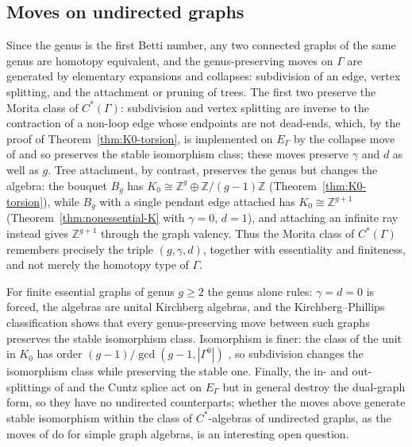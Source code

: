 \documentclass[12pt,reqno]{amsart}
\theoremstyle{plain}
\theoremstyle{definition}
\newcommand{\Z}{\mathbb{Z}}
\begin{document}
\subsection*{Moves on undirected graphs}
Since the genus is the first Betti number, any two connected graphs of the same genus are homotopy
equivalent, and the genus-preserving moves on $\Gamma$ are generated by elementary expansions and
collapses: subdivision of an edge, vertex splitting, and the attachment or pruning of trees. The
first two preserve the Morita class of $C^*(\Gamma)$: subdivision and vertex splitting are inverse
to the contraction of a non-loop edge whose endpoints are not dead-ends, which, by the proof of
Theorem~\ref{thm:K0-torsion}, is implemented on $E_\Gamma$ by the collapse move of
\cite[Theorem~5.2]{Sorensen} and so preserves the stable isomorphism class; these moves preserve
$\gamma$ and $d$ as well as $g$. Tree attachment, by contrast, preserves the genus but changes the
algebra: the bouquet $B_g$ has $K_0\cong\Z^{g}\oplus\Z/(g-1)\Z$
\textup(Theorem~\ref{thm:K0-torsion}\textup), while $B_g$ with a single pendant edge attached has
$K_0\cong\Z^{g+1}$ \textup(Theorem~\ref{thm:nonessential-K} with $\gamma=0$, $d=1$\textup), and
attaching an infinite ray instead gives $\Z^{g+1}$ through the graph valency. Thus the Morita
class of $C^*(\Gamma)$ remembers precisely the triple $(g,\gamma,d)$, together with essentiality
and finiteness, and not merely the homotopy type of $\Gamma$.

For finite essential graphs of genus $g\ge 2$ the genus alone rules: $\gamma=d=0$ is forced, the
algebras are unital Kirchberg algebras, and the Kirchberg--Phillips classification \cite{Phillips}
shows that every genus-preserving move between such graphs preserves the stable isomorphism class.
Isomorphism is finer: the class of the unit in $K_0$ has order $(g-1)/\gcd(g-1,|\Gamma^0|)$
\cite{CLM}, so subdivision changes the isomorphism class while preserving the stable one. Finally,
the in- and out-splittings of \cite{Sorensen} and the Cuntz splice act on $E_\Gamma$ but in
general destroy the dual-graph form, so they have no undirected counterparts; whether the moves
above generate stable isomorphism within the class of $C^*$-algebras of undirected graphs, as the
moves of \cite{Sorensen} do for simple graph algebras, is an interesting open question.
\end{document}
